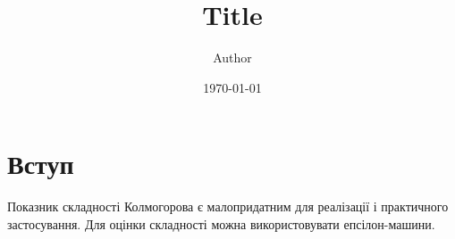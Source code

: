 \documentclass[14pt]{article}
\title{ Title}
\author{ Author }
\date{\today}
\begin{document}
	\maketitle	

\section{Вступ}

Показник складності Колмогорова є малопридатним для реалізації і практичного застосування. Для оцінки складності можна використовувати епсілон-машини.

	
	
\end{document}

